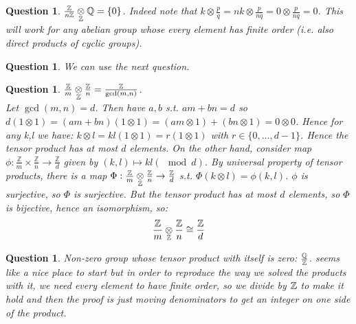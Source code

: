 \documentclass[a4paper]{article}
\newtheorem{que}[thm]{Question}
\begin{document}
\begin{que}
    $\frac{\mathbb{Z}}{n\mathbb{Z}} \mathbin{\mathop{\otimes}\limits_{\mathbb{Z}}} \mathbb{Q}=\left\{ 0 \right\} $. Indeed note that $k\otimes \frac{p}{q}=nk\otimes \frac{p}{nq}=0\otimes \frac{p}{nq}=0$. This will work for any abelian group whose every element has finite order (i.e. also direct products of cyclic groups).
\end{que}
\begin{que}
	We can use the next question.
\end{que}
\begin{que}
    $\frac{\mathbb{Z}}{m} \mathbin{\mathop{\otimes}\limits_{\mathbb{Z}}} \frac{\mathbb{Z}}{n}=\frac{\mathbb{Z}}{\gcd\left( m,n \right) }$.
    \\Let $\gcd(m,n)=d$. Then have  $a,b$ s.t. $am+bn=d$ so $d(1 \otimes 1) = (am+bn)(1 \otimes 1) = (am \otimes 1) + (bn \otimes 1)= 0 \otimes 0$. Hence for any k,l we have:
    $k\otimes l=kl (1\otimes 1)=r\left( 1\otimes 1 \right)$ with $r\in \{0, \ldots ,d-1\}$. Hence the tensor product has at most $d$ elements. On the other hand, consider map $\phi : \frac{\mathbb{Z}}{m} \times \frac{\mathbb{Z}}{n} \to \frac{\mathbb{Z}}{d}$ given by $(k,l) \mapsto kl (\mod d)$. By universal property of tensor products, there is a map $\Phi : \frac{\mathbb{Z}}{m} \mathbin{\mathop{\otimes}\limits_{\mathbb{Z}}} \frac{\mathbb{Z}}{n} \to \frac{\mathbb{Z}}{d}$ s.t. $\Phi(k \otimes l) = \phi(k, l)$. $\phi$ is surjective, so $\Phi$ is surjective. But the tensor product has at most $d$ elements, so $\Phi$ is bijective, hence an isomorphism, so:
    $$\frac{\mathbb{Z}}{m} \mathbin{\mathop{\otimes}\limits_{\mathbb{Z}}} \frac{\mathbb{Z}}{n} \cong \frac{\mathbb{Z}}{d}$$
    
\end{que}
\begin{que}
    Non-zero group whose tensor product with itself is zero: $\frac{\mathbb{Q}}{\mathbb{Z}}$. \Q seems like a nice place to start but in order to reproduce the way we solved the products with it, we need every element to have finite order, so we divide by $\mathbb{Z}$ to make it hold and then the proof is just moving denominators to get an integer on one side of the product.
\end{que}
\end{document}
